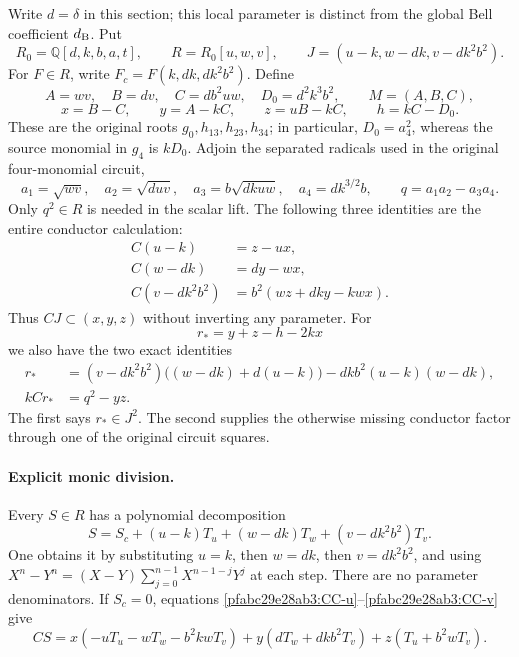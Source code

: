 Write $d=\delta$ in this section; this local parameter is distinct from
the global Bell coefficient $d_{\rm B}$. Put
\[
 R_0=\mathbb Q[d,k,b,a,t],\qquad R=R_0[u,w,v],\qquad
 J=(u-k,w-dk,v-dk^2b^2).
\]
For $F\in R$, write $F_c=F(k,dk,dk^2b^2)$. Define
\[
 A=wv,\quad B=dv,\quad C=db^2uw,\quad D_0=d^2k^3b^2,
 \qquad M=(A,B,C),
\]
\[
 x=B-C,\qquad y=A-kC,\qquad z=uB-kC,\qquad h=kC-D_0.
\]
These are the original roots $g_0,h_{13},h_{23},h_{34}$; in particular,
$D_0=a_4^2$, whereas the source monomial in $g_4$ is $kD_0$.
Adjoin the separated radicals used in the original four-monomial circuit,
\[
 a_1=\sqrt{wv},\quad a_2=\sqrt{duv},\quad
 a_3=b\sqrt{dkuw},\quad a_4=dk^{3/2}b,
 \qquad q=a_1a_2-a_3a_4.
\]
Only $q^2\in R$ is needed in the scalar lift. The following three identities
are the entire conductor calculation:
\begin{align}
 C(u-k)&=z-ux,\label{pfabc29e28ab3:CC-u}\\
 C(w-dk)&=dy-wx,\label{pfabc29e28ab3:CC-w}\\
 C(v-dk^2b^2)&=b^2(wz+dky-kwx).\label{pfabc29e28ab3:CC-v}
\end{align}
Thus $CJ\subset(x,y,z)$ without inverting any parameter.
For
\[
 r_*=y+z-h-2kx
\]
we also have the two exact identities
\begin{align}
 r_*&=(v-dk^2b^2)\bigl((w-dk)+d(u-k)\bigr)
       -dkb^2(u-k)(w-dk),\label{pfabc29e28ab3:CC-star}\\
 kCr_*&=q^2-yz.\label{pfabc29e28ab3:CC-repair}
\end{align}
The first says $r_*\in J^2$. The second supplies the otherwise missing
conductor factor through one of the original circuit squares.

\paragraph{Explicit monic division.}
Every $S\in R$ has a polynomial decomposition
\[
 S=S_c+(u-k)T_u+(w-dk)T_w+(v-dk^2b^2)T_v.                 \tag{CC1}
\]
One obtains it by substituting $u=k$, then $w=dk$, then $v=dk^2b^2$,
and using $X^n-Y^n=(X-Y)\sum_{j=0}^{n-1}X^{n-1-j}Y^j$ at each step.
There are no parameter denominators. If $S_c=0$, equations
\eqref{pfabc29e28ab3:CC-u}--\eqref{pfabc29e28ab3:CC-v} give
\[
 CS=x(-uT_u-wT_w-b^2kwT_v)
     +y(dT_w+dkb^2T_v)+z(T_u+b^2wT_v).                 \tag{CC2}
\]

